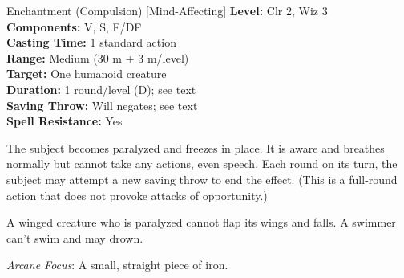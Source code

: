 {Enchantment (Compulsion) [Mind-Affecting]}
{
	\textbf{Level:}
	Clr 2, Wiz 3\\
	\textbf{Components:}
	V, S, F/DF\\
	\textbf{Casting Time:}
	1 standard action\\
	\textbf{Range:}
	Medium (30 m + 3 m/level)\\
	\textbf{Target:}
	One humanoid creature\\
	\textbf{Duration:}
	1 round/level (D); see text\\
	\textbf{Saving Throw:}
	Will negates; see text\\
	\textbf{Spell Resistance:}
	Yes\\
}
{
	The subject becomes paralyzed and freezes in place. It is aware and breathes normally but cannot take any actions, even speech. Each round on its turn, the subject may attempt a new saving throw to end the effect. (This is a full-round action that does not provoke attacks of opportunity.)

	A winged creature who is paralyzed cannot flap its wings and falls. A swimmer can't swim and may drown.

	\textit{Arcane Focus}:
	A small, straight piece of iron.

}
